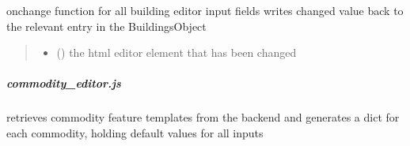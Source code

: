 \documentclass[letterpaper,10pt,english]{sphinxmanual}
\begin{document}

\begin{fulllineitems}
\label{\detokenize{docs_gui/js_api/urbs_editor/buildings_editor:writeBackEditedBuildingFeatures}}
\pysigstartsignatures
{}
\pysigstopsignatures
\sphinxAtStartPar
onchange function for all building editor input fields
writes changed value back to the relevant entry in the BuildingsObject
\begin{quote}\begin{description}
\begin{itemize}
\item {} 
\sphinxAtStartPar
{} () \textendash{} the html editor element that has been changed

\end{itemize}

\end{description}\end{quote}

\end{fulllineitems}


\sphinxstepscope


\subparagraph{commodity\_editor.js}
\label{\detokenize{docs_gui/js_api/urbs_editor/commodity_editor:commodity-editor-js}}\label{\detokenize{docs_gui/js_api/urbs_editor/commodity_editor::doc}}

\begin{fulllineitems}
\label{\detokenize{docs_gui/js_api/urbs_editor/commodity_editor:fetchCommodityProfiles}}
\pysigstartsignatures
{}
\pysigstopsignatures
\sphinxAtStartPar
retrieves commodity feature templates from the backend and generates a dict for each commodity, holding default values for all inputs

\end{fulllineitems}

\end{document}
